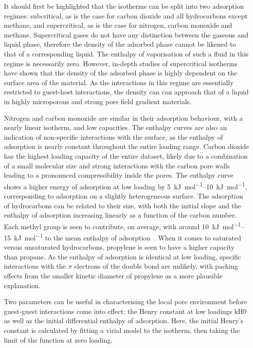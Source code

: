 It should first be highlighted that the isotherms can be split into 
two adsorption regimes: subcritical, as is the case for carbon
dioxide and all hydrocarbons except methane, and supercritical,
as is the case for nitrogen, carbon monoxide and methane.
Supercritical gases do not have any distinction between the 
gaseous and liquid phase, therefore the density of the adsorbed phase
cannot be likened to that of a corresponding liquid. The enthalpy
of vaporisation of such a fluid in this regime is necessarily zero.
However, in-depth studies of supercritical 
isotherms~\cite{doAdsorptionSupercriticalFluids2003} have shown that
the density of the adsorbed phase is highly dependent on the surface 
area of the material. As the interactions in this regime are essentially
restricted to guest-host interactions, the density can can approach that
of a liquid in highly microporous and strong pore field gradient materials.

Nitrogen and carbon monoxide are similar in their adsorption behaviour,
with a nearly linear isotherm, and low capacities.
The enthalpy curves are also an indication of non-specific 
interactions with the surface, as the enthalpy of adsorption
is nearly constant throughout the entire loading range.
Carbon dioxide has the highest loading capacity of the entire dataset, 
likely due to a combination of a small molecular size and strong 
interactions with the carbon pore walls leading to a pronounced 
compressibility inside the pores. The enthalpy curve shows a higher energy
of adsorption at low loading by \SIrange{5}{10}{\kilo\joule\per\mole}, 
corresponding to adsorption on a slightly heterogeneous surface.
The adsorption of hydrocarbons can be related to their size, with
both the initial slope and the enthalpy of adsorption increasing linearly
as a function of the carbon number. Each methyl group is seen 
to contribute, on average, with around 
\SIrange{10}{15}{\kilo\joule\per\mole}
to the mean enthalpy of adsorption~\cite{denayerChromatographicStudyAdsorption1998}.
When it comes to saturated versus unsaturated hydrocarbons, propylene is 
seen to have a higher capacity than propane. As the enthalpy of 
adsorption is identical at low loading, specific interactions with the 
\(\pi\) electrons of the double bond are unlikely, with packing effects 
from the smaller kinetic diameter of propylene as a more plausible
explanation.

Two parameters can be useful in characterising the local pore environment
before guest-guest interactions come into effect: the Henry constant at
low loadings \gls{kH0} as well as the initial differential enthalpy of
adsorption. Here, the initial Henry's constant is calculated by fitting
a virial model to the isotherm, then taking the limit of the function at
zero loading. 

